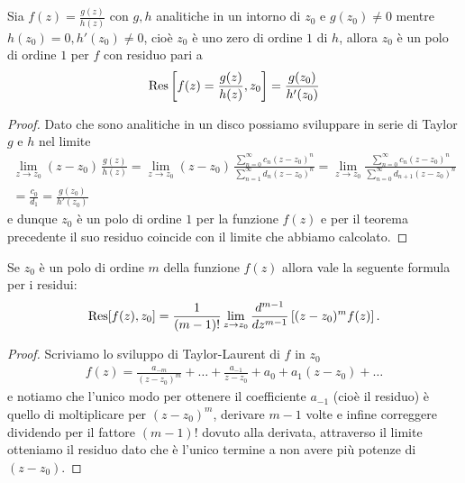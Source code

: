 \begin{theorem}[  ]
  Sia $ f(z) = \frac{g(z)}{h(z)} $ con $ g,h $ analitiche in un intorno di $ z_0 $ e $ g(z_0) \neq 0 $ mentre $ h(z_0) = 0, h'(z_0) \neq 0 $, cioè 
  $ z_0 $ è uno zero di ordine $ 1 $ di $ h $, allora $ z_0 $ è un polo di ordine $ 1 $ per $ f $ con residuo pari a 
  \begin{align}
    \operatorname{\textnormal{Res}}\left[ f(z) = \frac{g(z)}{h(z)}, z_0 \right] = \frac{g(z_0)}{h'(z_0)}
  \end{align}
\end{theorem}
\begin{proof}
  Dato che sono analitiche in un disco possiamo sviluppare in serie di Taylor $ g $ e $ h $ nel limite 
  \begin{gather}
    \lim_{z \to z_0} (z - z_0)\, \frac{g(z)}{h(z)} 
    = \lim_{z \to z_0} (z - z_0)\, \frac{\sum_{n = 0}^\infty c_n (z - z_0)^n}{\sum_{n = 1}^\infty d_n (z - z_0)^n}
    = \lim_{z \to z_0}  \frac{\sum_{n = 0}^\infty c_n (z - z_0)^n}{\sum_{n = 0}^\infty d_{n + 1} (z - z_0)^n} 
    \\
    = \frac{c_0}{d_1} = \frac{g(z_0)}{h'(z_0)}
  \end{gather}
  e dunque $ z_0 $ è un polo di ordine $ 1 $ per la funzione $ f(z) $ e per il teorema precedente il suo residuo coincide con il limite che abbiamo 
  calcolato.
\end{proof}

\begin{theorem}[  ]
  Se $ z_0 $ è un polo di ordine $ m $ della funzione $ f(z) $ allora vale la seguente formula per i residui:
  \begin{align}
    \operatorname{\textnormal{Res}}[ f(z), z_0 ] = \frac1{( m - 1)!} \lim_{z \to z_0} \frac{d^{m -1}}{dz^{m-1}} \left[ (z - z_0)^m f(z) \right].
  \end{align}
\end{theorem}
\begin{proof}
  Scriviamo lo sviluppo di Taylor-Laurent di $ f $ in $ z_0 $
  \begin{align}
    f(z) = \frac{a_{-m}}{(z - z_0)^m} +\dots + \frac{a_{-1}}{z - z_0} + a_0 + a_1 (z - z_0) + \dots
  \end{align}
  e notiamo che l'unico modo per ottenere il coefficiente $ a_{-1} $ (cioè il residuo) è quello di moltiplicare per $ (z - z_0)^m $, derivare $ m -1 $ 
  volte e infine correggere dividendo per il fattore $ (m -1)! $ dovuto alla derivata, attraverso il limite otteniamo il residuo dato che è l'unico 
  termine a non avere più potenze di $ (z - z_0) $. 
\end{proof}

